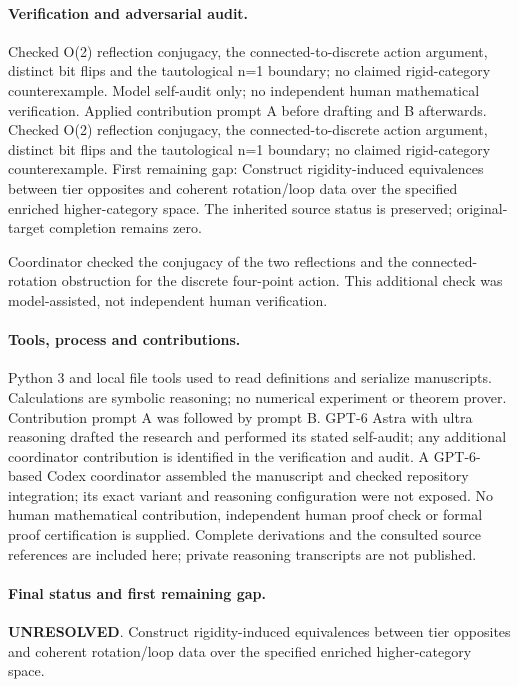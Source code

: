 \documentclass[11pt]{article}
\begin{document}
\paragraph{Verification and adversarial audit.}
Checked O(2) reflection conjugacy, the connected-to-discrete action argument, distinct bit flips and the tautological n=1 boundary; no claimed rigid-category counterexample. Model self-audit only; no independent human mathematical verification. Applied contribution prompt A before drafting and B afterwards. Checked O(2) reflection conjugacy, the connected-to-discrete action argument, distinct bit flips and the tautological n=1 boundary; no claimed rigid-category counterexample. First remaining gap: Construct rigidity-induced equivalences between tier opposites and coherent rotation/loop data over the specified enriched higher-category space. The inherited source status is preserved; original-target completion remains zero.

Coordinator checked the conjugacy of the two reflections and the connected-rotation obstruction for the discrete four-point action. This additional check was model-assisted, not independent human verification.

\paragraph{Tools, process and contributions.}
Python 3 and local file tools used to read definitions and serialize manuscripts. Calculations are symbolic reasoning; no numerical experiment or theorem prover. Contribution prompt A was followed by prompt B. GPT-6 Astra with ultra reasoning drafted the research and performed its stated self-audit; any additional coordinator contribution is identified in the verification and audit. A GPT-6-based Codex coordinator assembled the manuscript and checked repository integration; its exact variant and reasoning configuration were not exposed. No human mathematical contribution, independent human proof check or formal proof certification is supplied. Complete derivations and the consulted source references are included here; private reasoning transcripts are not published.

\paragraph{Final status and first remaining gap.}
\textbf{UNRESOLVED}. Construct rigidity-induced equivalences between tier opposites and coherent rotation/loop data over the specified enriched higher-category space.
\end{document}
